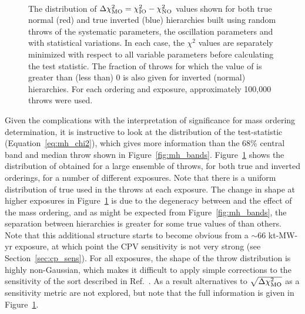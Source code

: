 \begin{figure*}[htbp]
  \centering
  \\
  \caption{The distribution of $\Delta\chi^{2}_{\mathrm{MO}} = \chi^{2}_{\mathrm{IO}} - \chi^{2}_{\mathrm{NO}}$ values shown for both true normal (red) and true inverted (blue) hierarchies built using random throws of the systematic parameters, the oscillation parameters and with statistical variations. In each case, the $\chi^{2}$ values are separately minimized with respect to all variable parameters before calculating the test statistic. The fraction of throws for which the value of \dchisqMO is greater than (less than) 0 is also given for inverted (normal) hierarchies. For each ordering and exposure, approximately 100,000 throws were used.}
  \label{fig:mh_comp_over_time}
\end{figure*}
Given the complications with the interpretation of significance for mass ordering determination, it is instructive to look at the distribution of the test-statistic (Equation~\ref{eq:mh_chi2}), which gives more information than the 68\% central band and median throw shown in Figure~\ref{fig:mh_bands}. Figure~\ref{fig:mh_comp_over_time} shows the distribution of \dchisqMO obtained for a large ensemble of throws, for both true and inverted orderings, for a number of different exposures. Note that there is a uniform distribution of true \deltacp used in the throws at each exposure. The change in shape at higher exposures in Figure~\ref{fig:mh_comp_over_time} is due to the degeneracy between \deltacp and the effect of the mass ordering, and as might be expected from Figure~\ref{fig:mh_bands}, the separation between hierarchies is greater for some true values of \deltacp than others. Note that this additional structure starts to become obvious from a $\sim$66 kt-MW-yr exposure, at which point the CPV sensitivity is not very strong (see Section~\ref{sec:cp_sens}). For all exposures, the shape of the throw distribution is highly non-Gaussian, which makes it difficult to apply simple corrections to the sensitivity of the sort described in Ref.~\cite{Blennow:2013oma}. As a result alternatives to $\sqrt{\Delta\chi^{2}_{\mathrm{MO}}}$ as a sensitivity metric are not explored, but note that the full information is given in Figure~\ref{fig:mh_comp_over_time}.

